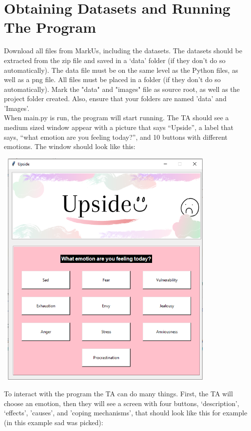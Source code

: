 \documentclass{article}
\begin{document}
    \section{Obtaining Datasets and Running The Program}

    Download all files from MarkUs, including the datasets. The datasets should be extracted from the zip file and saved in a ‘data’ folder (if they don’t do so automatically). The data file must be on the same level as the Python files, as well as a png file. All files must be placed in a folder (if they don't do so automatically). Mark the "data" and "images" file as source root, as well as the project folder created. Also, ensure that your folders are named 'data' and 'Images'.\\

    When main.py is run, the program will start running. The TA should see a medium sized window appear with a picture that says “Upside”, a label that says, “what emotion are you feeling today?”, and 10 buttons with different emotions. The window should look like this:\\

    \begin{center}
        \includegraphics[width=11cm,height=12cm]{Images/upside.png}
    \end{center}

    To interact with the program the TA can do many things. First, the TA will choose an emotion, then they will see a screen with four buttons, ‘description’, ‘effects', 'causes', and 'coping mechanisms', that should look like this for example (in this example sad was picked): \\
\end{document}
